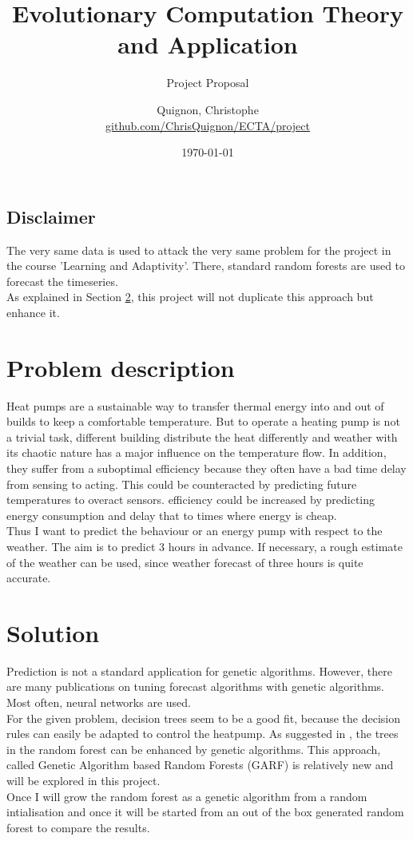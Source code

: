 \documentclass{scrartcl}
\begin{document}
\title{Evolutionary Computation Theory and Application}
\subtitle{Project Proposal}
\author{
  Quignon, Christophe \\
  \href{https://github.com/ChrisQuignon/ECTA/report}{github.com/ChrisQuignon/ECTA/project}
}
\date{\today}


\maketitle

\subsection*{Disclaimer}
The very same data is used to attack the very same problem for the project in the course 'Learning and Adaptivity'. There, standard random forests are used to forecast the timeseries.\\
As explained in Section \ref{sec:Solution}, this project will not duplicate this approach but enhance it.

\section{Problem description}
Heat pumps are a sustainable way to transfer thermal energy into and out of  builds to keep a comfortable temperature. But to operate a heating pump is not a trivial task, different building distribute the heat differently and weather with its chaotic nature has a major influence on the temperature flow. In addition, they suffer from a suboptimal efficiency because they often have a bad time delay from sensing to acting. This could be counteracted by predicting future temperatures to overact sensors. efficiency could be increased by predicting energy consumption and delay that to times where energy is cheap.\\
Thus I want to predict the behaviour or an energy pump with respect to the weather. The aim is to predict 3 hours in advance. If necessary, a rough estimate of the weather can be used, since weather forecast of three hours is quite accurate.

\section{Solution}
\label{sec:Solution}

Prediction is not a standard application for genetic algorithms. However, there are many publications on tuning forecast algorithms with genetic algorithms. Most often, neural networks are used.\\
For the given problem, decision trees seem to be a good fit, because the decision rules can easily be adapted to control the heatpump. As suggested in \cite{bader2012garf}, the trees in the random forest can be enhanced by genetic algorithms. This approach, called  Genetic Algorithm based Random Forests (GARF) is relatively new and will be explored in this project.\\
Once I will grow the random forest as a genetic algorithm from a random intialisation and once it will be started from an out of the box generated random forest to compare the results.
\end{document}
